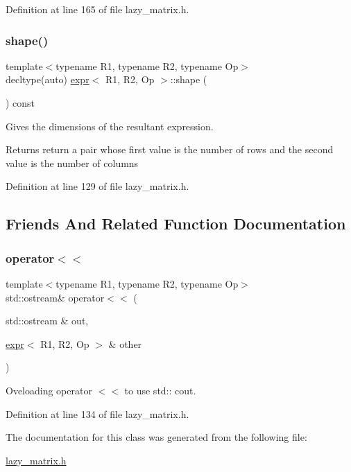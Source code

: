 Definition at line 165 of file lazy\+\_\+matrix.\+h.

\mbox{\label{classexpr_aa61617d3e742a72e3ebbe3e289c32818}} 
\subsubsection{\texorpdfstring{shape()}{shape()}}
{\footnotesize\ttfamily template$<$typename R1, typename R2, typename Op$>$ \\
decltype(auto) \mbox{\hyperlink{classexpr}{expr}}$<$ R1, R2, Op $>$\+::shape (\begin{DoxyParamCaption}{ }\end{DoxyParamCaption}) const\hspace{0.3cm}{\ttfamily [inline]}}



Gives the dimensions of the resultant expression. 

\begin{DoxyReturn}{Returns}
return a pair whose first value is the number of rows and the second value is the number of columns 
\end{DoxyReturn}


Definition at line 129 of file lazy\+\_\+matrix.\+h.



\subsection{Friends And Related Function Documentation}
\mbox{\label{classexpr_a2298d0a57665feadc1e35ac9df610dc8}} 
\subsubsection{\texorpdfstring{operator$<$$<$}{operator<<}}
{\footnotesize\ttfamily template$<$typename R1, typename R2, typename Op$>$ \\
std\+::ostream\& operator$<$$<$ (\begin{DoxyParamCaption}\item[{std\+::ostream \&}]{out,  }\item[{\mbox{\hyperlink{classexpr}{expr}}$<$ R1, R2, Op $>$ \&}]{other }\end{DoxyParamCaption})\hspace{0.3cm}{\ttfamily [friend]}}



Oveloading operator $<$$<$ to use std\+:\+: cout. 



Definition at line 134 of file lazy\+\_\+matrix.\+h.



The documentation for this class was generated from the following file\+:\begin{DoxyCompactItemize}
\item 
\mbox{\hyperlink{lazy__matrix_8h}{lazy\+\_\+matrix.\+h}}\end{DoxyCompactItemize}
